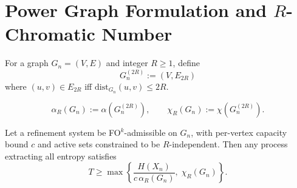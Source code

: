 \section{Power Graph Formulation and $R$-Chromatic Number}

\begin{definition}
For a graph $G_n=(V,E)$ and integer $R\ge1$, define
\[
G_n^{(2R)} := (V, E_{2R})
\]
where $(u,v)\in E_{2R}$ iff $\mathrm{dist}_{G_n}(u,v)\le 2R$.
\end{definition}

\begin{definition}
\[
\alpha_R(G_n) := \alpha(G_n^{(2R)}), \qquad
\chi_R(G_n) := \chi(G_n^{(2R)}).
\]
\end{definition}

\begin{theorem}
Let a refinement system be FO$^k$-admissible on $G_n$, with per-vertex capacity bound $c$ and active sets constrained to be $R$-independent. Then any process extracting all entropy satisfies
\[
T \ge \max\!\left\{
\frac{H(X_n)}{c\,\alpha_R(G_n)},
\;
\chi_R(G_n)
\right\}.
\]
\end{theorem}

